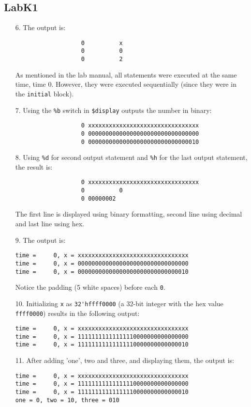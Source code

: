 \documentclass{article}
\begin{document}
\subsection{LabK1}
\begin{enumerate}
\item[6. ] The output is:
    \begin{verbatim}
                   0          x
                   0          0
                   0          2
    \end{verbatim}
    
    As mentioned in the lab manual, all statements were executed at the same time, time 0. However, they were executed sequentially (since they were in the \verb$initial$ block).

    \pagebreak

\item[7. ] Using the \verb$%b$ switch in \verb#$display# outputs the number in binary:
    \begin{verbatim}
                   0 xxxxxxxxxxxxxxxxxxxxxxxxxxxxxxxx
                   0 00000000000000000000000000000000
                   0 00000000000000000000000000000010
    \end{verbatim}

\item[8. ] Using \verb$%d$ for second output statement and \verb$%h$ for the last output statement, the result is:
    \begin{verbatim}
                   0 xxxxxxxxxxxxxxxxxxxxxxxxxxxxxxxx
                   0          0
                   0 00000002
    \end{verbatim}
    The first line is displayed using binary formatting, second line using decimal and last line using hex.

\item[9. ] The output is:
    \begin{verbatim}
time =     0, x = xxxxxxxxxxxxxxxxxxxxxxxxxxxxxxxx
time =     0, x = 00000000000000000000000000000000
time =     0, x = 00000000000000000000000000000010
    \end{verbatim}
    Notice the padding (5 white spaces) before each \verb$0$.

\item[10. ] Initializing \verb$x$ as \verb$32'hffff0000$ (a 32-bit integer with the hex value \verb$ffff0000$) results in the following output:
    \begin{verbatim}
time =     0, x = xxxxxxxxxxxxxxxxxxxxxxxxxxxxxxxx
time =     0, x = 11111111111111110000000000000000
time =     0, x = 11111111111111110000000000000010
    \end{verbatim}

\item[11. ] After adding 'one', two and three, and displaying them, the output is:
    \begin{verbatim}
time =     0, x = xxxxxxxxxxxxxxxxxxxxxxxxxxxxxxxx
time =     0, x = 11111111111111110000000000000000
time =     0, x = 11111111111111110000000000000010
one = 0, two = 10, three = 010
    \end{verbatim}


\end{enumerate}
\end{document}
